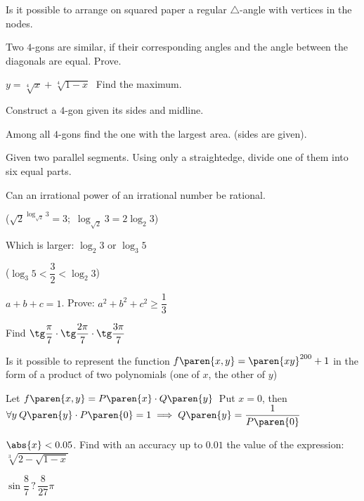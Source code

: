 \documentclass{article}
\newcommand{\strikethrough}[1]{}  %
\begin{document}
\problem  %
Is it possible to arrange on squared paper a regular $\triangle$-angle with vertices in the nodes.


\problem  %
Two $4$-gons are similar, if their corresponding angles and the angle between the diagonals are equal.
Prove.


\problem  %
$y = \sqrt[4]{x} + \sqrt[4]{1 - x} \;$
Find the maximum.


\problem  %
Construct a $4$-gon given its sides and midline.


\problem  %
Among all $4$-gons find the one with the largest area. (sides are given).


\problem  %
Given two parallel segments.
Using only a straightedge, divide one of them into six equal parts.


\problem  %
Can an irrational power of an irrational number be rational.

($\sqrt{2}^{\log_{\sqrt{2}}{3}} = 3$; $\, \log_{\sqrt{2}}{3} = 2 \log_{2}{3}$)


\problem  %
Which is larger: $\log_2 3$ or $\log_3 5$

($\log_{3}{5} < \dfrac{3}{2} < \log_{2}{3}$)


\problem  %
$a + b + c = 1$.
Prove: $a^2 + b^2 + c^2 \geq \dfrac{1}{3}$


\problem  %
Find $\tg\dfrac{\pi}{7} \cdot \tg\dfrac{2\pi}{7} \cdot \tg\dfrac{3\pi}{7}$


\problem  %
Is it possible to represent the function $f\paren{x, y} = \paren{x y}^{200} + 1$
in the form of a product of two polynomials (one of $x$, the other of $y$)

\strikethrough{$\paren{\varphi\paren{x} \pm 1} \paren{\psi\paren{y} \pm 1}
                = \varphi\paren{x} \psi\paren{y} \pm \varphi\paren{x} \pm \psi\paren{y} + 1$}

Let $f\paren{x, y} = P\paren{x} \cdot Q\paren{y} \,$
Put $x = 0$, then
$\forall y \: Q\paren{y} \cdot P\paren{0} = 1
 \implies
 Q\paren{y} = \dfrac{1}{P\paren{0}}$ \newline
\strikethrough{Then $Q\paren{y}$ - has infinitely many roots.}


\problem  %
$\abs{x} < 0.05$.
Find with an accuracy up to $0.01$ the value of the expression: $\sqrt[3]{2 - \sqrt{1 - x}}$


\problem  %
$\sin\dfrac{8}{7} \mathrel{?} \dfrac{8}{27} \pi$
\end{document}
